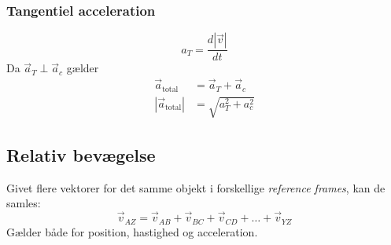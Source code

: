 \subsubsection{Tangentiel acceleration}
\[
    a_T = \frac{d |\vec v|}{dt}
\]
Da $\vec a_T \perp \vec a_c$ gælder 
\begin{align*}
    \vec a_\text{total} &= \vec a_T + \vec a_c \\
    |\vec a_\text{total}| &= \sqrt{a_T^2 + a_c^2}
\end{align*}

\subsection{Relativ bevægelse}
Givet flere vektorer for det samme objekt i forskellige \textit{reference frames}, kan de samles:
\[
    \vec v_{AZ} = \vec v_{AB} + \vec v_{BC} + \vec v_{CD} + \ldots + \vec v_{YZ}
\]
Gælder både for position, hastighed og acceleration.